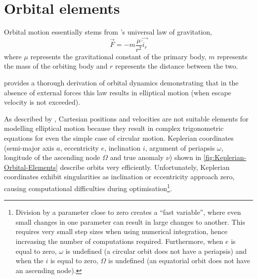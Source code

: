 \section{Orbital elements} \label{sec:Orbital-Elements}

Orbital motion essentially stems from \textcite{Newton1687}'s universal law of gravitation, 
\begin{equation}
\vec{F}=-m\frac{\mu}{r^{2}}\vec{\hat{i}_{r}} \label{eq:Fgravity}
\end{equation}
where $\mu$ represents the gravitational constant of the primary body, $m$  represents the mass of the orbiting body and $r$ represents the distance between the two.
 
\textcite{Kaplan1976} provides a thorough derivation of orbital dynamics demonstrating that in the absence of external forces this law results in elliptical motion (when escape velocity is not exceeded). %

As described by \textcite{Letterio_thesis}, Cartesian positions and velocities are not suitable elements for modelling elliptical motion because they result in complex trigonometric equations for even the simple case of circular motion. Keplerian coordinates (semi-major axis $a$, eccentricity $e$, inclination $i$, argument of periapsis $\omega$, longitude of the ascending node $\Omega$ and true anomaly $\nu$) shown in \autoref{fig:Keplerian-Orbital-Elements} describe orbits very efficiently. Unfortunately, Keplerian coordinates exhibit singularities as inclination or eccentricity approach zero, causing computational difficulties during optimisation\footnote{Division by a parameter close to zero creates a \enquote{fast variable}, where even small changes in one parameter can result in large changes to another. This requires very small step sizes when using numerical integration, hence increasing the number of computations required. Furthermore, when $e$ is equal to zero, $\omega$ is undefined (a circular orbit does not have a periapsis) and when the $i$ is equal to zero, $\Omega$ is undefined (an equatorial orbit does not have an ascending node).}.


